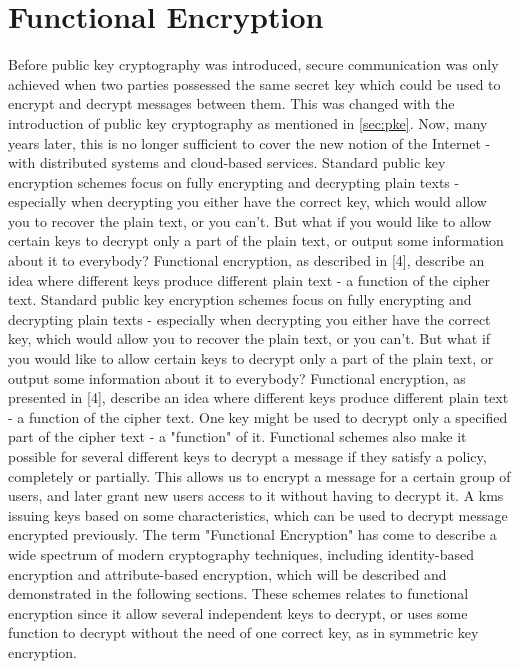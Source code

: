 \section{Functional Encryption}
Before public key cryptography was introduced, secure communication was only achieved when two parties possessed the same secret key which could be used to encrypt and decrypt messages between them. This was changed with the introduction of public key cryptography as mentioned in \ref{sec:pke}. Now, many years later, this is no longer sufficient to cover the new notion of the Internet - with distributed systems and cloud-based services. 
Standard public key encryption
schemes focus on fully encrypting and decrypting plain texts - especially when
decrypting you either have the correct key, which would allow you to recover the
plain text, or you can’t. But what if you would like to allow certain keys to decrypt
only a part of the plain text, or output some information about it to everybody?
Functional encryption, as described in [4], describe an idea where different keys
produce different plain text - a function of the cipher text. Standard public key encryption schemes focus on fully encrypting and decrypting plain texts - especially when decrypting you either have the correct key, which would allow you to recover the plain text, or you can’t. But what if you would like to allow certain keys to decrypt only a part of the plain text, or output some information about it to everybody? Functional encryption, as presented in [4], describe an idea where different keys produce different plain text - a function of the cipher text. One key might be used to decrypt only a specified part of the cipher text - a "function" of it. Functional schemes also make it possible for several different keys to decrypt a message if they satisfy a policy, completely or partially. This allows us to encrypt a message for a certain group of users, and later grant new users access to it without having to decrypt it. A \gls{kms} issuing  keys based on some characteristics, which can be used to decrypt message encrypted previously. The term "Functional Encryption" has come to describe a wide spectrum of modern cryptography techniques, including identity-based encryption and attribute-based encryption, which will be described and demonstrated in the following sections. These schemes relates to functional encryption since it allow several independent keys to decrypt, or uses some function to decrypt without the need of one correct key, as in symmetric key encryption.


